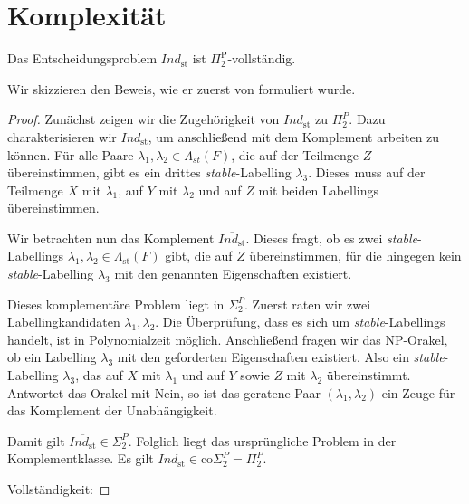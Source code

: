 \section{Komplexität}
\begin{Theorem}
    \label{th:ind-st-is-pi2p-c}
    Das Entscheidungsproblem \(\textit{Ind}_{\mathrm{st}}\) ist
    \(\Pi_2^\text{P}\)-vollständig.
\end{Theorem}

Wir skizzieren den Beweis, wie er zuerst von \textcite{bluemel:2025:independence-aba} formuliert wurde. 

\begin{proof}
    \label{pr:ind-st-is-pi2p-c-correct}
    Zunächst zeigen wir die Zugehörigkeit von
    \(\textit{Ind}_{\mathrm{st}}\) zu \(\Pi_2^P\).    
    Dazu charakterisieren wir \(\textit{Ind}_{\mathrm{st}}\), um anschließend mit dem Komplement arbeiten zu können. 
    Für alle Paare \(\lambda_1, \lambda_2 \in \varLambda_{st}(F)\), die auf der Teilmenge $Z$ übereinstimmen, 
    gibt es ein drittes \textit{stable}-Labelling $\lambda_3$. Dieses muss auf der Teilmenge $X$ mit $\lambda_1$, 
    auf $Y$ mit $\lambda_2$ und auf $Z$ mit beiden Labellings übereinstimmen.

    Wir betrachten nun das Komplement \(\overline{\textit{Ind}_{\mathrm{st}}}\). 
    Dieses fragt, ob es zwei
    \textit{stable}-Labellings \(\lambda_1,\lambda_2\in\Lambda_{\mathrm{st}}(F)\)
    gibt, die auf \(Z\) übereinstimmen, für die hingegen kein
    \textit{stable}-Labelling \(\lambda_3\) mit den genannten Eigenschaften
    existiert.

    Dieses komplementäre Problem liegt in \(\Sigma_2^{P}\). 
    Zuerst raten wir zwei Labellingkandidaten \(\lambda_1, \lambda_2\). Die Überprüfung, dass es sich um \textit{stable}-Labellings handelt, ist in 
    Polynomialzeit möglich. 
    Anschließend fragen wir das NP-Orakel, ob ein Labelling $\lambda_3$ mit den geforderten Eigenschaften existiert. 
    Also ein \textit{stable}-Labelling \(\lambda_3\), das auf $X$ mit $\lambda_1$ und auf $Y$ sowie $Z$ mit $\lambda_2$ übereinstimmt.
    Antwortet das Orakel mit Nein, so ist das geratene Paar \((\lambda_1,\lambda_2)\) ein Zeuge für das Komplement der Unabhängigkeit.
    
    Damit gilt \(\overline{\textit{Ind}_{\mathrm{st}}} \in \Sigma_2^{P}\). Folglich liegt das ursprüngliche Problem in der Komplementklasse. 
    Es gilt \( \textit{Ind}_{\mathrm{st}}\in \mathrm{co}\Sigma_2^P=\Pi_2^P.\)

    Vollständigkeit:
\end{proof}

